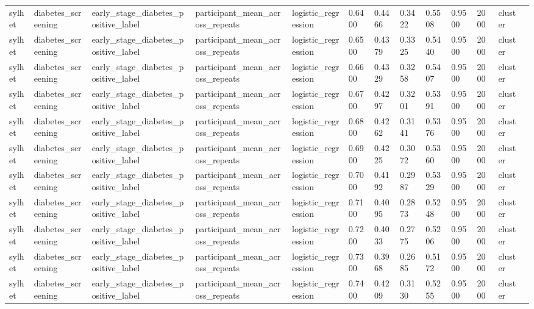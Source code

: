 \begin{tabular}{lllllllllllll}
sylhet & diabetes\_screening & early\_stage\_diabetes\_positive\_label & participant\_mean\_across\_repeats & logistic\_regression & 0.6400 & 0.4466 & 0.3422 & 0.5508 & 0.9500 & 2000 & cluster &  \\
sylhet & diabetes\_screening & early\_stage\_diabetes\_positive\_label & participant\_mean\_across\_repeats & logistic\_regression & 0.6500 & 0.4379 & 0.3325 & 0.5440 & 0.9500 & 2000 & cluster &  \\
sylhet & diabetes\_screening & early\_stage\_diabetes\_positive\_label & participant\_mean\_across\_repeats & logistic\_regression & 0.6600 & 0.4329 & 0.3258 & 0.5407 & 0.9500 & 2000 & cluster &  \\
sylhet & diabetes\_screening & early\_stage\_diabetes\_positive\_label & participant\_mean\_across\_repeats & logistic\_regression & 0.6700 & 0.4297 & 0.3201 & 0.5391 & 0.9500 & 2000 & cluster &  \\
sylhet & diabetes\_screening & early\_stage\_diabetes\_positive\_label & participant\_mean\_across\_repeats & logistic\_regression & 0.6800 & 0.4262 & 0.3141 & 0.5376 & 0.9500 & 2000 & cluster &  \\
sylhet & diabetes\_screening & early\_stage\_diabetes\_positive\_label & participant\_mean\_across\_repeats & logistic\_regression & 0.6900 & 0.4225 & 0.3072 & 0.5360 & 0.9500 & 2000 & cluster &  \\
sylhet & diabetes\_screening & early\_stage\_diabetes\_positive\_label & participant\_mean\_across\_repeats & logistic\_regression & 0.7000 & 0.4192 & 0.2987 & 0.5329 & 0.9500 & 2000 & cluster &  \\
sylhet & diabetes\_screening & early\_stage\_diabetes\_positive\_label & participant\_mean\_across\_repeats & logistic\_regression & 0.7100 & 0.4095 & 0.2873 & 0.5248 & 0.9500 & 2000 & cluster &  \\
sylhet & diabetes\_screening & early\_stage\_diabetes\_positive\_label & participant\_mean\_across\_repeats & logistic\_regression & 0.7200 & 0.4033 & 0.2775 & 0.5206 & 0.9500 & 2000 & cluster &  \\
sylhet & diabetes\_screening & early\_stage\_diabetes\_positive\_label & participant\_mean\_across\_repeats & logistic\_regression & 0.7300 & 0.3968 & 0.2685 & 0.5172 & 0.9500 & 2000 & cluster &  \\
sylhet & diabetes\_screening & early\_stage\_diabetes\_positive\_label & participant\_mean\_across\_repeats & logistic\_regression & 0.7400 & 0.4209 & 0.3130 & 0.5255 & 0.9500 & 2000 & cluster &  \\

\end{tabular}
